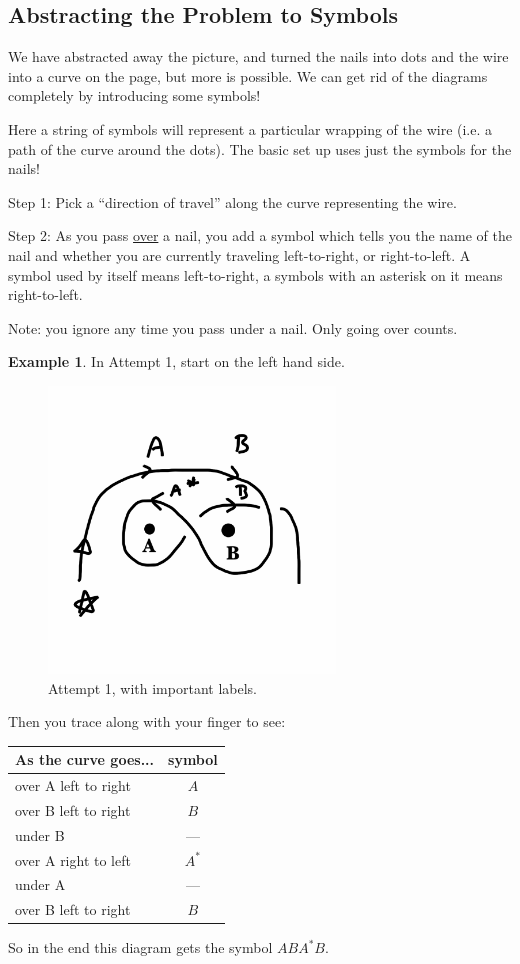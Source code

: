 \documentclass[12pt,letterpaper]{article}
\theoremstyle{definition}
\newtheorem{example}{Example}
\begin{document}
\clearpage
\subsection*{Abstracting the Problem to Symbols}

We have abstracted away the picture, and turned the nails into dots and the wire into a curve on the page, but more is possible.
We can get rid of the diagrams completely by introducing some symbols!

Here a string of symbols will represent a particular wrapping of the wire (i.e. a path of the curve around the dots).
The basic set up uses just the symbols for the nails!

\noindent
Step 1: Pick a ``direction of travel'' along the curve representing the wire.

\noindent
Step 2: As you pass \underline{over} a nail, you add a symbol which tells you the name of the nail and whether you are currently traveling left-to-right, or right-to-left. A symbol used by itself means left-to-right, a symbols with an asterisk on it means right-to-left.

Note: you ignore any time you pass under a nail. Only going over counts.

\begin{example}
In Attempt 1, start on the left hand side.
\begin{figure}[h]
    \centering
    \includegraphics[height=3in]{phppics/coded.png}
    \caption{Attempt 1, with important labels.}
\end{figure}
Then you trace along with your finger to see:\\
\begin{center}
\begin{tabular}{lc}
As the curve goes... & symbol \\
\hline
over A left to right & $A$\\
over B left to right & $B$\\
under B & --- \\
over A right to left & $A^*$\\
under A & --- \\
over B left to right & $B$ 
\end{tabular}
\end{center}
So in the end this diagram gets the symbol $ABA^*B$.
\end{example}
\end{document}
